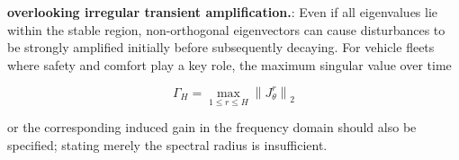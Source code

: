 \documentclass[11pt,a4paper,openany]{book}
\numberwithin{equation}{chapter}
\numberwithin{figure}{chapter}
\numberwithin{table}{chapter}
\begin{document}
\textbf{overlooking irregular transient amplification.}: Even if all eigenvalues ​​lie within the stable region, non-orthogonal eigenvectors can cause disturbances to be strongly amplified initially before subsequently decaying. For vehicle fleets where safety and comfort play a key role, the maximum singular value over time

\begin{equation}
\Gamma_H=\max_{1\le r\le H}\left\|J_\theta^r\right\|_2
\label{eq:ml-transient-gain}
\end{equation}

or the corresponding induced gain in the frequency domain should also be specified; stating merely the spectral radius is insufficient.
\end{document}
